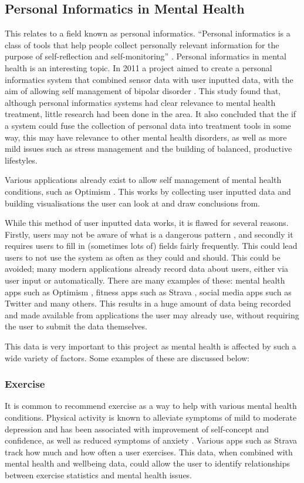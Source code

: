 \documentclass[11pt,openright,a4paper]{report}
\begin{document}
\subsection{Personal Informatics in Mental Health}
This relates to a field known as personal informatics. \enquote{Personal informatics is a class of tools that help people collect personally relevant information for the purpose of self-reflection and self-monitoring} \parencite{personalinformatics}. Personal informatics in mental health is an interesting topic. In 2011 a project aimed to create a personal informatics system that combined sensor data with user inputted data, with the aim of allowing self management of bipolar disorder \parencite{pimentalhealth}. This study found that, although personal informatics systems had clear relevance to mental health treatment, little research had been done in the area. It also concluded that the if a system could fuse the collection of personal data into treatment tools in some way, this may have relevance to other mental health disorders, as well as more mild issues such as stress management and the building of balanced, productive lifestyles.

Various applications already exist to allow self management of mental health conditions, such as Optimism \parencite{optimism}. This works by collecting user inputted data and building visualisations the user can look at and draw conclusions from.

While this method of user inputted data works, it is flawed for several reasons. Firstly, users may not be aware of what is a dangerous pattern \parencite{pimentalhealth}, and secondly it requires users to fill in (sometimes lots of) fields fairly frequently. This could lead users to not use the system as often as they could and should. This could be avoided; many modern applications already record data about users, either via user input or automatically. There are many examples of these: mental health apps such as Optimism \parencite{optimism}, fitness apps such as Strava \parencite{strava}, social media apps such as Twitter \parencite{twitter} and many others. This results in a huge amount of data being recorded and made available from applications the user may already use, without requiring the user to submit the data themselves.

This data is very important to this project as mental health is affected by such a wide variety of factors. Some examples of these are discussed below:

\subsubsection{Exercise}
It is common to recommend exercise as a way to help with various mental health conditions. Physical activity is known to alleviate symptoms of mild to moderate depression and has been associated with improvement of self-concept and confidence, as well as reduced symptoms of anxiety \parencite{exercisementalhealth}. Various apps such as Strava \parencite{strava} track how much and how often a user exercises. This data, when combined with mental health and wellbeing data, could allow the user to identify relationships between exercise statistics and mental health issues.
\end{document}
